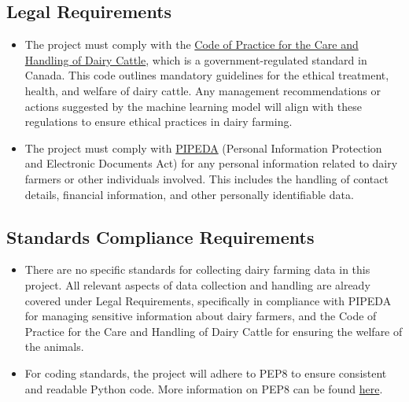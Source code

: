 \documentclass[12pt]{article}
\begin{document}
\subsection{Legal Requirements}
\begin{itemize}
	\item The project must comply with the
	      \href{https://www.nfacc.ca/codes-of-practice/dairy-cattle}{Code of
	      Practice for the Care and Handling of Dairy Cattle}, which is a
	      government-regulated standard in Canada. This code outlines mandatory
	      guidelines for the ethical treatment, health, and welfare of dairy
	      cattle. Any management recommendations or actions suggested by the
	      machine learning model will align with these regulations to ensure
	      ethical practices in dairy farming.
	        
	\item The project must comply with
	      \href{https://laws-lois.justice.gc.ca/pdf/p-8.6.pdf}{PIPEDA} (Personal
	      Information Protection and Electronic Documents Act) for any personal
	      information related to dairy farmers or other individuals involved. This
	      includes the handling of contact details, financial information, and
	      other personally identifiable data.
\end{itemize}
\subsection{Standards Compliance Requirements}
\begin{itemize}
	\item There are no specific standards for collecting dairy farming data in
	      this project. All relevant aspects of data collection and handling are
	      already covered under Legal Requirements, specifically in compliance
	      with PIPEDA for managing sensitive information about dairy farmers, and
	      the Code of Practice for the Care and Handling of Dairy Cattle for
	      ensuring the welfare of the animals.
	\item For coding standards, the project will adhere to PEP8 to ensure
	      consistent and readable Python code. More information on PEP8 can be
	      found \href{https://peps.python.org/pep-0008/}{here}.
\end{itemize}
\end{document}
